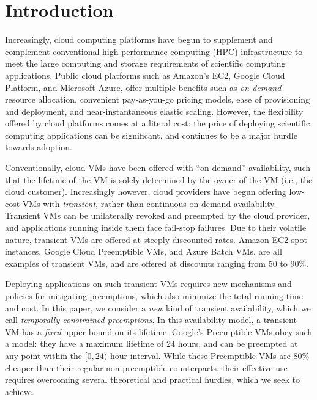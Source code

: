 \section{Introduction}
\label{sec:intro}

Increasingly, cloud computing platforms have begun to supplement and complement conventional high performance computing (HPC) infrastructure to meet the large computing and storage requirements of scientific computing applications. Public cloud platforms such as Amazon's EC2, Google Cloud Platform, and Microsoft Azure, offer multiple benefits such as \emph{on-demand} resource allocation, convenient pay-as-you-go pricing models, ease of provisioning and deployment, and near-instantaneous elastic scaling. 
However, the flexibility offered by cloud platforms comes at a literal cost: the price of deploying scientific computing applications can be significant, and continues to be a major hurdle towards adoption. 

Conventionally, cloud VMs have been offered with ``on-demand'' availability, such that the lifetime of the VM is solely determined by the owner of the VM (i.e., the cloud customer). 
Increasingly however, cloud providers have begun offering low-cost VMs with \emph{transient}, rather than continuous on-demand availability. 
Transient VMs can be unilaterally revoked and preempted by the cloud provider, and applications running inside them face fail-stop failures. 
Due to their volatile nature, transient VMs are offered at steeply discounted rates. Amazon EC2 spot instances, Google Cloud Preemptible VMs, and Azure Batch VMs, are all examples of transient VMs, and are offered at discounts ranging from 50 to 90\%.  


Deploying applications on such transient VMs requires new mechanisms and policies for mitigating preemptions, which also minimize the total running time and cost.
%
In this paper, we consider a \emph{new} kind of transient availability, which we call \emph{temporally constrained preemptions}.
In this availability model, a transient VM has a \emph{fixed} upper bound on its lifetime.
Google's Preemptible VMs obey such a model: they have a maximum lifetime of 24 hours, and can be preempted at any point within the $[0, 24)$ hour interval.
While these Preemptible VMs are 80\% cheaper than their regular non-preemptible counterparts, their effective use requires overcoming several theoretical and practical hurdles, which we seek to achieve.

